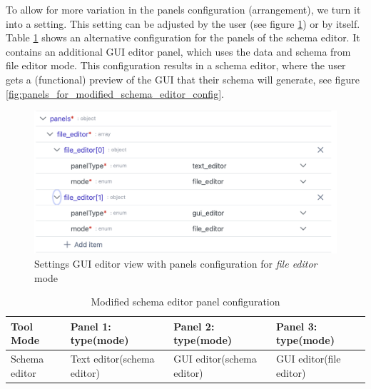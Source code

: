 To allow for more variation in the panels configuration (arrangement), we turn it into a setting.
This setting can be adjusted by the user (see figure \ref{fig:panels_definition_file_editor}) or by \toolname{} itself.
Table \ref{tab:panels_by_mode_schema_editor_with_preview} shows an alternative configuration for the panels of the schema editor.
It contains an additional GUI editor panel, which uses the data and schema from file editor mode. 
This configuration results in a schema editor, where the user gets a (functional) preview of the GUI that their schema will generate, see figure \ref{fig:panels_for_modified_schema_editor_config}.


\begin{figure}[!t]
    \centering
    \includegraphics[width=\columnwidth]{figures/panels_definition_file_editor}
    \caption{Settings GUI editor view with panels configuration for \textit{file editor} mode}
    \label{fig:panels_definition_file_editor}
\end{figure}


\begin{table}[!t]
\caption{Modified schema editor panel configuration}
\label{tab:panels_by_mode_schema_editor_with_preview}
\centering\tiny
\begin{tabular}{@{}llll@{}}
\toprule
\textbf{Tool Mode} & \textbf{Panel 1: type(mode)} & \textbf{Panel 2: type(mode)}& \textbf{Panel 3: type(mode)} \\ \midrule
Schema editor      & Text editor(schema editor)   & GUI editor(schema editor)   & GUI editor(file editor)    
  \\ \bottomrule
\end{tabular}
\end{table}


